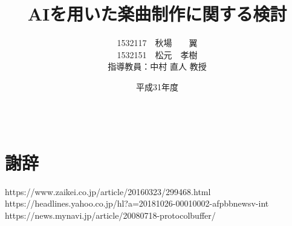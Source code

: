 \documentclass[12pt]{jreport}
\title{AIを用いた楽曲制作に関する検討}					%
\author{1532117　秋場　　翼\\1532151　松元　孝樹\\\normalsize 指導教員：中村 直人 教授}	%
\date{平成31年度}                   %
\begin{document}
\maketitle                        	%
\tableofcontents               	%
\listoffigures				%
\listoftables				%

\baselineskip 20pt              	%

\clearpage
{}



%






\newpage




\chapter*{　\\謝辞}


\begin{thebibliography}{99}%



https://www.zaikei.co.jp/article/20160323/299468.html
https://headlines.yahoo.co.jp/hl?a=20181026-00010002-afpbbnewsv-int
https://news.mynavi.jp/article/20080718-protocolbuffer/




\end{thebibliography}

\end{document}
